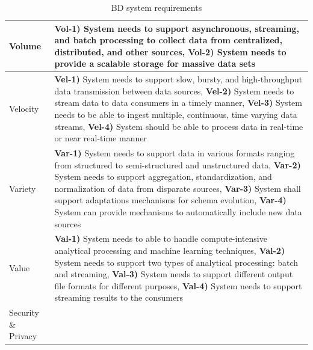 \documentclass[a4paper,11pt,article,oneside]{memoir}
\begin{document}
\begin{table}[h]
    \centering
    \caption{BD system requirements}
    \renewcommand*{\arraystretch}{1.1}
    \begin{tabular}{|m{1.2cm}|m{14cm}|}

        \hline

        Volume &

        \textbf{Vol-1)} System needs to support asynchronous, streaming, and batch processing to collect data from centralized, distributed, and other sources, \textbf{Vol-2)} System needs to provide a scalable storage for massive data sets 
        \\
        \hline
        Velocity & 
        
        \textbf{Vel-1)} System needs to support slow, bursty, and high-throughput data transmission between data sources, \textbf{Vel-2)} System needs to stream data to data consumers in a timely manner, \textbf{Vel-3)} System needs to be able to ingest multiple, continuous, time varying data streams, \textbf{Vel-4)} System should be able to process data in real-time or near real-time manner 
        \\ 

        \hline

        Variety & 

        \textbf{Var-1)} System needs to support data in various formats ranging from structured to semi-structured and unstructured data, \textbf{Var-2)} System needs to support aggregation, standardization, and normalization of data from disparate sources, \textbf{Var-3)} System shall support adaptations mechanisms for schema evolution, \textbf{Var-4)} System can provide mechanisms to automatically include new data sources 
        \\

        \hline

        Value & 
        
        \textbf{Val-1)} System needs to able to handle compute-intensive analytical processing and machine learning techniques, \textbf{Val-2)} System needs to support two types of analytical processing: batch and streaming, \textbf{Val-3)} System needs to support different output file formats for different purposes, \textbf{Val-4)} System needs to support streaming results to the consumers 
        \\

        \hline

        Security \& Privacy & 
        

\end{tabular}
\end{table}
\end{document}
